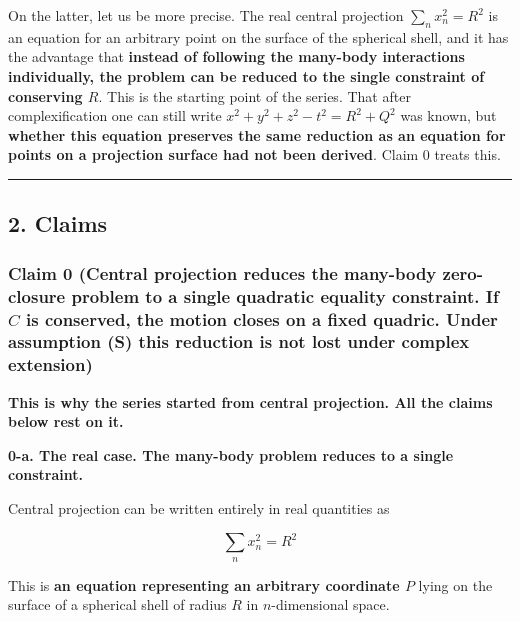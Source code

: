 \documentclass[
  10pt,
]{article}
\begin{document}
On the latter, let us be more precise. The real central projection
\(\sum_n x_n^2 = R^2\) is an equation for an arbitrary point on the
surface of the spherical shell, and it has the advantage that
\textbf{instead of following the many-body interactions individually,
the problem can be reduced to the single constraint of conserving
\(R\)}. This is the starting point of the series. That after
complexification one can still write \(x^2+y^2+z^2-t^2 = R^2+Q^2\) was
known, but \textbf{whether this equation preserves the same reduction as
an equation for points on a projection surface had not been derived}.
Claim 0 treats this.

\begin{center}\rule{0.5\linewidth}{0.5pt}\end{center}

\subsection{2. Claims}\label{claims}

\subsubsection{\texorpdfstring{Claim 0 (Central projection reduces the
many-body zero-closure problem to a single quadratic equality
constraint. If \(C\) is conserved, the motion closes on a fixed quadric.
\textbf{Under assumption (S)} this reduction is not lost under complex
extension)}{Claim 0 (Central projection reduces the many-body zero-closure problem to a single quadratic equality constraint. If C is conserved, the motion closes on a fixed quadric. Under assumption (S) this reduction is not lost under complex extension)}}\label{claim-0-central-projection-reduces-the-many-body-zero-closure-problem-to-a-single-quadratic-equality-constraint.-if-c-is-conserved-the-motion-closes-on-a-fixed-quadric.-under-assumption-s-this-reduction-is-not-lost-under-complex-extension}

\textbf{This is why the series started from central projection. All the
claims below rest on it.}

\textbf{0-a. The real case. The many-body problem reduces to a single
constraint.}

Central projection can be written entirely in real quantities as

\[\sum_n x_n^2 = R^2\]

This is \textbf{an equation representing an arbitrary coordinate \(P\)}
lying on the surface of a spherical shell of radius \(R\) in
\(n\)-dimensional space.
\end{document}
